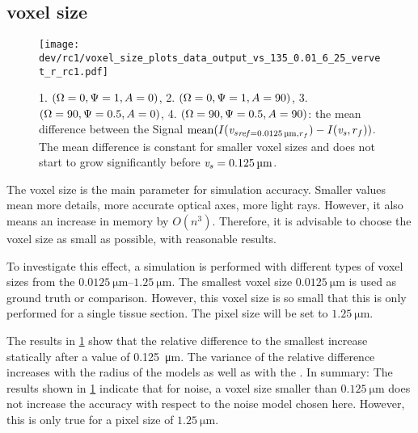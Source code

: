 \subsection{voxel size \texorpdfstring{\voxels{}}{}}
% 
% 
\begin{figure}[!tp]%
\centering
\texttt{[image: dev/rc1/voxel\_size\_plots\_data\_output\_vs\_135\_0.01\_6\_25\_vervet\_r\_rc1.pdf]}
\caption[voxel size model with noise]{1. $(\textnormal{$\Omega$}=0, \textnormal{$\Psi$}=1, \textnormal{$A$}=0)$, 2. $(\textnormal{$\Omega$}=0, \textnormal{$\Psi$}=1, \textnormal{$A$}=90)$, 3. $(\textnormal{$\Omega$}=90, \textnormal{$\Psi$}=0.5, \textnormal{$A$}=0)$, 4. $(\textnormal{$\Omega$}=90, \textnormal{$\Psi$}=0.5, \textnormal{$A$}=90)$: the mean difference between the Signal $\mean(\intensity(\voxels_{\mathit{ref} = \SI{0.0125}{\micro\meter}, \fiberRadius})- \intensity(\voxels, \fiberRadius))$. The mean difference is constant for smaller voxel sizes and does not start to grow significantly before $\voxels=\SI{0.125}{\micro\meter}$. }
\label{fig:voxelsizeNoise}
\end{figure}
% 
The voxel size \voxelsize{} is the main parameter for simulation accuracy.
Smaller values mean more details, more accurate optical axes, more light rays.
However, it also means an increase in memory by $O(n^3)$.
Therefore, it is advisable to choose the voxel size as small as possible, with reasonable results.
\par
% 
To investigate this effect, a simulation is performed with different types of voxel sizes from the $\SIrange{0.0125}{1.25}{\micro\meter}$.
The smallest voxel size $\SI{0.0125}{\micro\meter}$ is used as ground truth or comparison. 
However, this voxel size is so small that this is only performed for a single tissue section. 
The pixel size \pixelsize{} will be set to $\SI{1.25}{\micro\meter}$. 
\par
%
The results  in \cref{fig:voxelsizeNoise} show that the relative difference to the smallest \voxelsize{} increase statically after a value of \SI{0.125}{\micro\meter}.
The variance of the relative difference increases with the radius of the models as well as with the \voxelsize{}.
% 
In summary:
The results shown in \cref{fig:voxelsizeNoise} indicate that for noise, a voxel size smaller than $\SI{0.125}{\micro\meter}$ does not increase the accuracy with respect to the noise model chosen here.
However, this is only true for a pixel size of $\SI{1.25}{\micro\meter}$.
% 
% 
% 
